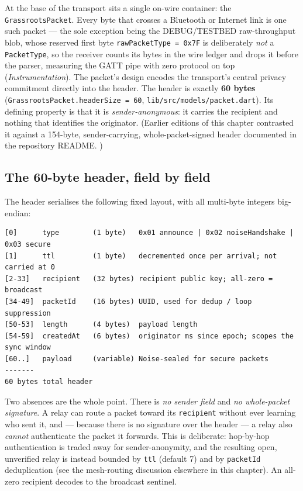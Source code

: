 \documentclass[11pt]{report}
\newcommand{\code}[1]{\texttt{\small #1}}
\begin{document}
At the base of the transport sits a single on-wire container: the \code{GrassrootsPacket}. Every byte that crosses a Bluetooth or Internet link is one such packet --- the sole exception being the DEBUG/TESTBED raw-throughput blob, whose reserved first byte \code{rawPacketType = 0x7F} is deliberately \emph{not} a \code{PacketType}, so the receiver counts its bytes in the wire ledger and drops it before the parser, measuring the GATT pipe with zero protocol on top (\emph{Instrumentation}). The packet's design encodes the transport's central privacy commitment directly into the header. The header is exactly \textbf{60 bytes} (\code{GrassrootsPacket.headerSize = 60}, \code{lib/src/models/packet.dart}). Its defining property is that it is \emph{sender-anonymous}: it carries the recipient and nothing that identifies the originator. (Earlier editions of this chapter contrasted it against a 154-byte, sender-carrying, whole-packet-signed header documented in the repository README. )

\subsection*{The 60-byte header, field by field}

The header serialises the following fixed layout, with all multi-byte integers big-endian:

\begin{verbatim}
[0]      type        (1 byte)   0x01 announce | 0x02 noiseHandshake | 0x03 secure
[1]      ttl         (1 byte)   decremented once per arrival; not carried at 0
[2-33]   recipient   (32 bytes) recipient public key; all-zero = broadcast
[34-49]  packetId    (16 bytes) UUID, used for dedup / loop suppression
[50-53]  length      (4 bytes)  payload length
[54-59]  createdAt   (6 bytes)  originator ms since epoch; scopes the sync window
[60..]   payload     (variable) Noise-sealed for secure packets
-------
60 bytes total header
\end{verbatim}

Two absences are the whole point. There is \emph{no sender field} and \emph{no whole-packet signature}. A relay can route a packet toward its \code{recipient} without ever learning who sent it, and — because there is no signature over the header — a relay also \emph{cannot} authenticate the packet it forwards. This is deliberate: hop-by-hop authentication is traded away for sender-anonymity, and the resulting open, unverified relay is instead bounded by \code{ttl} (default 7) and by \code{packetId} deduplication (see the mesh-routing discussion elsewhere in this chapter). An all-zero recipient decodes to the broadcast sentinel.
\end{document}
